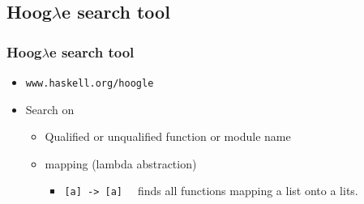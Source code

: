 \subsection{Hoog$\lambda$e search tool}

\begin{frame}[fragile]
  \frametitle{Hoog$\lambda$e search tool}
  \begin{itemize}
    \item \texttt{www.haskell.org/hoogle}
    \item Search on
      \begin{itemize}
        \item Qualified or unqualified function or module name
        \item mapping (lambda abstraction)
          \begin{itemize}
            \item \verb+[a] -> [a]  + finds all functions mapping a list onto a lits.
          \end{itemize}
      \end{itemize}    
  \end{itemize}
\end{frame}